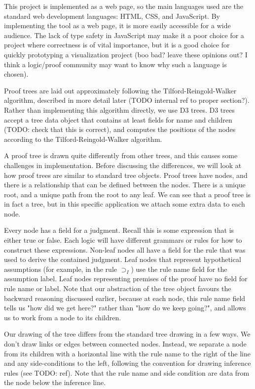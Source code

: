 \documentclass[conference]{IEEEtran}
\begin{document}
This project is implemented as a web page, so the main languages used are the standard web development languages: HTML, CSS, and JavaScript. By implementing the tool as a web page, it is more easily accessible for a wide audience. The lack of type safety in JavaScript may make it a poor choice for a project where correctness is of vital importance, but it is a good choice for quickly prototyping a visualization project (boo bad? leave these opinions out? I think a logic/proof community may want to know why such a language is chosen).

Proof trees are laid out approximately following the Tilford-Reingold-Walker algorithm, described in more detail later (TODO internal ref to proper section?). Rather than implementing this algorithm directly, we use D3 trees. D3 trees accept a tree data object that contains at least fields for name and children (TODO: check that this is correct), and computes the positions of the nodes according to the Tilford-Reingold-Walker algorithm.

A proof tree is drawn quite differently from other trees, and this causes some challenges in implementation. Before discussing the differences, we will look at how proof trees are similar to standard tree objects. Proof trees have nodes, and there is a relationship that can be defined between the nodes. There is a unique root, and a unique path from the root to any leaf. We can see that a proof tree is in fact a tree, but in this specific application we attach some extra data to each node.

Every node has a field for a judgment. Recall this is some expression that is either true or false. Each logic will have different grammars or rules for how to construct these expressions. Non-leaf nodes all have a field for the rule that was used to derive the contained judgment. Leaf nodes that represent hypothetical assumptions (for example, in the rule $\supset_I$) use the rule name field for the assumption label. Leaf nodes representing premises of the proof have no field for rule name or label. Note that our abstraction of the tree object favours the backward reasoning discussed earlier, because at each node, this rule name field tells us "how did we get here?" rather than "how do we keep going?", and allows us to work from a node to its children.

Our drawing of the tree differs from the standard tree drawing in a few ways. We don't draw links or edges between connected nodes. Instead, we separate a node from its children with a horizontal line with the rule name to the right of the line and any side-conditions to the left, following the convention for drawing inference rules (see TODO: ref). Note that the rule name and side condition are data from the node below the inference line.
\end{document}
